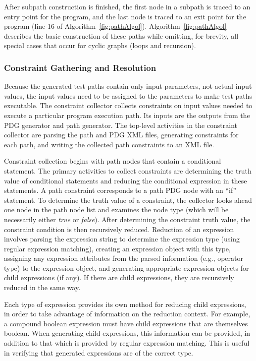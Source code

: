 After subpath construction is finished, the first node 
in a subpath is traced to an entry point for the program, 
and the last node is traced to an exit point for the program 
(line 16 of Algorithm~\ref{fig:pathAlgol}). 
Algorithm~\ref{fig:pathAlgol} describes the basic construction 
of these paths while omitting, for brevity, all special cases 
that occur for cyclic graphs (loops and recursion).

\subsubsection{Constraint Gathering and Resolution}

Because the generated test paths contain only input parameters, not 
actual input values, the input values need to be assigned to the 
parameters to make test paths executable.
The constraint collector collects constraints on input
values needed to execute a particular program execution path.
Its inputs are the outputs from the PDG generator and path
generator. The top-level activities in the constraint collector
are parsing the path and PDG XML files, generating constraints
for each path, and writing the collected path constraints to
an XML file. 

Constraint collection begins with path nodes that contain
a conditional statement. The primary activities to collect
constraints are determining the truth value of conditional
statements and reducing the conditional expression in these
statements. 
A path constraint corresponds to a path PDG node with an
``if'' statement. To determine the truth value of
a constraint, the collector looks ahead one node in the
path node list and examines the node type (which will be
necessarily either \textit{true} or \textit{false}). After
determining the constraint truth value, the constraint
condition is then recursively reduced. Reduction of
an expression involves parsing the expression string
to determine the expression type (using regular expression
matching), creating an expression object with this type,
assigning any expression attributes from the parsed information
(e.g., operator type) to the expression object, and generating
appropriate expression objects for child expressions (if any).
If there are child expressions, they are recursively reduced
in the same way.

Each type of expression provides its own method for reducing
child expressions, in order to take advantage of information
on the reduction context. For example, a compound boolean
expression must have child expressions that are themselves
boolean. When generating child expressions, this information
can be provided, in addition to that which is provided by
regular expression matching. This is useful in verifying
that generated expressions are of the correct type.


